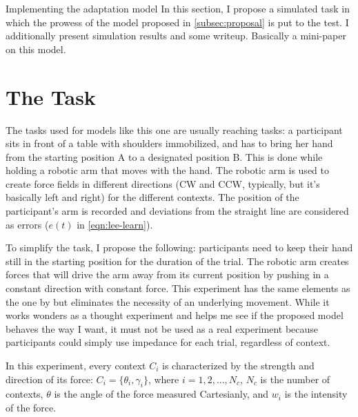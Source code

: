 \documentclass{report}
\begin{document}

\begin{chapter}{Implementing the adaptation model} In this section, I propose a
simulated task in which the prowess of the model proposed in
\ref{subsec:proposal} is put to the test. I additionally present simulation
results and some writeup. Basically a mini-paper on this model.

\section{The Task} The tasks used for models like this one are usually
\citep[e.g.][]{Lee_Dual_2009} reaching tasks: a participant sits in front of a
table with shoulders immobilized, and has to bring her hand from the starting
position A to a designated position B. This is done while holding a robotic arm
that moves with the hand. The robotic arm is used to create force fields in
different directions (CW and CCW, typically, but it's basically left and right)
for the different contexts. The position of the participant's arm is recorded
and deviations from the straight line are considered as errors ($e(t)$ in
\ref{eqn:lee-learn}).

To simplify the task, I propose the following: participants need to keep their
hand still in the starting position for the duration of the trial. The robotic
arm creates forces that will drive the arm away from its current position by
pushing in a constant direction with constant force. This experiment has the
same elements as the one by \cite{Lee_Dual_2009} but eliminates the necessity
of an underlying movement. While it works wonders as a thought experiment and
helps me see if the proposed model behaves the way I want, it must not be used
as a real experiment because participants could simply use impedance for each
trial, regardless of context.

In this experiment, every context $C_i$ is characterized by the strength and
direction of its force: $C_i = \{\theta_i, \gamma_i\}$, where $i = 1, 2, ...,
N_c$, $N_c$ is the number of contexts, $\theta$ is the angle of the force
measured Cartesianly, and $w_i$ is the intensity of the force.


\end{chapter}
\end{document}

